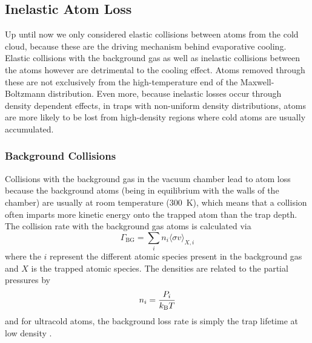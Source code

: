 
\subsection{Inelastic Atom Loss}
Up until now we only considered elastic collisions between atoms from the cold cloud, because these are the driving mechanism behind evaporative cooling. Elastic collisions with the background gas as well as inelastic collisions between the atoms however are detrimental to the cooling effect. Atoms removed through these are not exclusively from the high-temperature end of the Maxwell-Boltzmann distribution. Even more, because inelastic losses occur through density dependent effects, in traps with non-uniform density distributions, atoms are more likely to be lost from high-density regions where cold atoms are usually accumulated. 

\subsubsection*{Background Collisions}
Collisions with the background gas in the vacuum chamber lead to atom loss because the background atoms (being in equilibrium with the walls of the chamber) are usually at room temperature (\SI{300}{K}), which means that a collision often imparts more kinetic energy onto the trapped atom than the trap depth. The collision rate with the background gas atoms is calculated via
\begin{equation*}
    \Gamma_\text{BG} = \sum_i n_i \langle \sigma v \rangle_{X,i} 
\end{equation*}
where the $i$ represent the different atomic species present in the background gas and $X$ is the trapped atomic species. The densities are related to the partial pressures by
\begin{equation}
    n_i = \frac{P_i}{k_\text{B} T} \nonumber
\end{equation}
and for ultracold atoms, the background loss rate is simply the trap lifetime at low density \cite{PhysRevLett.91.123201}.

